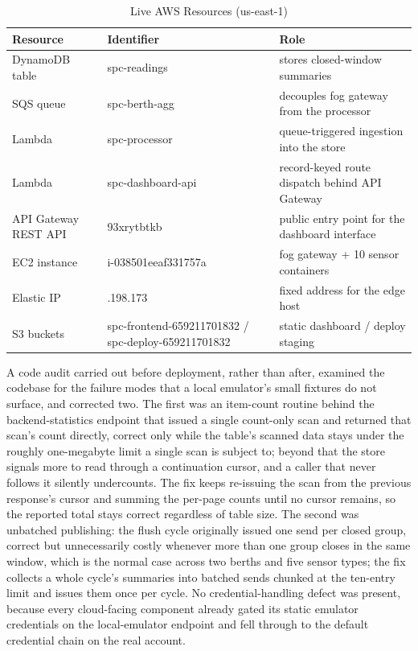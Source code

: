\documentclass[conference]{IEEEtran}
\begin{document}
\begin{table}[!t]
\caption{Live AWS Resources (us-east-1)}
\label{tab:resources}
\centering
\footnotesize
\begin{tabular}{|>{\raggedright\arraybackslash}p{1.7cm}|>{\raggedright\arraybackslash}p{2.9cm}|>{\raggedright\arraybackslash}p{2.6cm}|}
\hline
\textbf{Resource} & \textbf{Identifier} & \textbf{Role} \\
\hline
DynamoDB table & spc-readings & stores closed-window summaries \\
\hline
SQS queue & spc-berth-agg & decouples fog gateway from the processor \\
\hline
Lambda & spc-processor & queue-triggered ingestion into the store \\
\hline
Lambda & spc-dashboard-api & record-keyed route dispatch behind API Gateway \\
\hline
API Gateway REST API & 93xrytbtkb & public entry point for the dashboard interface \\
\hline
EC2 instance & i-038501eeaf331757a & fog gateway + 10 sensor containers \\
\hline
Elastic IP & 54.158.198.173 & fixed address for the edge host \\
\hline
S3 buckets & spc-frontend-659211701832 / spc-deploy-659211701832 & static dashboard / deploy staging \\
\hline
\end{tabular}
\end{table}

A code audit carried out before deployment, rather than after, examined the codebase for the failure modes that a local emulator's small fixtures do not surface, and corrected two. The first was an item-count routine behind the backend-statistics endpoint that issued a single count-only scan and returned that scan's count directly, correct only while the table's scanned data stays under the roughly one-megabyte limit a single scan is subject to; beyond that the store signals more to read through a continuation cursor, and a caller that never follows it silently undercounts. The fix keeps re-issuing the scan from the previous response's cursor and summing the per-page counts until no cursor remains, so the reported total stays correct regardless of table size. The second was unbatched publishing: the flush cycle originally issued one send per closed group, correct but unnecessarily costly whenever more than one group closes in the same window, which is the normal case across two berths and five sensor types; the fix collects a whole cycle's summaries into batched sends chunked at the ten-entry limit and issues them once per cycle. No credential-handling defect was present, because every cloud-facing component already gated its static emulator credentials on the local-emulator endpoint and fell through to the default credential chain on the real account.
\end{document}
